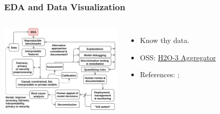 \documentclass[11pt,
               aspectratio=169,
               hyperref={colorlinks}
               ]{beamer}
\begin{document}
			\begin{frame}
			
				\frametitle{EDA and Data Visualization}		
				
				\begin{columns}
		
					\centering
					\includegraphics[height=120pt]{../img/eda.png}
					
					\vspace{-5pt}
					\begin{itemize}
						\item Know thy data.
						\item OSS: \href{http://docs.h2o.ai/h2o/latest-stable/h2o-docs/data-science/aggregator.html}{H2O-3 Aggregator}
						\item References: ; 
					\end{itemize}
					
				\end{columns}
			
			\end{frame}
					
\end{document}
